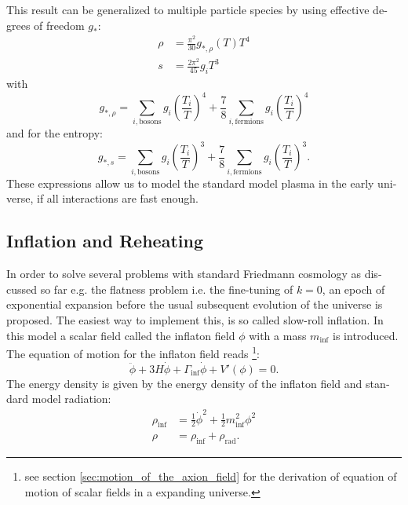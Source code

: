 \documentclass[master,       %
               twoside,        %
               BCOR10mm,       %
               english,ngerman, %
               ]{GAUBM}
\begin{document}
\begin{otherlanguage}{english}
This result can be generalized to multiple particle species by using effective degrees of freedom $g_*$:
\begin{align}
	\rho &= \frac{\pi^2}{30} g_{*, \rho}(T) T^4 \nonumber \\
	s &= \frac{2 \pi^2}{45} g_i T^3
\end{align}
with
\begin{equation}
	g_{*, \rho} = \sum_{i, \text{bosons}} g_i \left( \frac{T_i}{T} \right)^4 + \frac{7}{8} \sum_{i, \text{fermions}} g_i \left( \frac{T_i}{T} \right)^4
\end{equation}
and for the entropy:
\begin{equation}
	g_{*, s} = \sum_{i, \text{bosons}} g_i \left( \frac{T_i}{T} \right)^3 + \frac{7}{8} \sum_{i, \text{fermions}} g_i \left( \frac{T_i}{T} \right)^3.
\end{equation}
These expressions allow us to model the standard model plasma in the early universe, if
all interactions are fast enough.


\subsection{Inflation and Reheating}
In order to solve several problems with standard Friedmann cosmology as discussed so far e.g. the flatness problem i.e. the fine-tuning of $k = 0$,
an epoch of exponential expansion before the usual subsequent evolution of the universe is proposed. The easiest way to implement this, is so called slow-roll inflation. In this model a scalar field called the inflaton field $\phi$ with a mass $m_\mathrm{inf}$ is introduced. The equation of motion for the inflaton field reads \footnote{see section \ref{sec:motion_of_the_axion_field} for the derivation of equation of motion of scalar fields in a expanding universe.}:
\begin{equation}
	\label{eq:inflaton_field_eq}
	\ddot{\phi} + 3 H \dot{\phi} + \Gamma_\mathrm{inf} \dot{\phi} + V'(\phi) = 0.
\end{equation}
The energy density is given by the energy density of the inflaton field
and standard model radiation:
\begin{align}
	\rho_\mathrm{inf} &= \frac{1}{2} \dot{\phi}^2 + \frac{1}{2} m_\mathrm{inf}^2 \phi^2 \\
	\rho &= \rho_\mathrm{inf} + \rho_\mathrm{rad}.
\end{align}



\end{otherlanguage}
\end{document}

